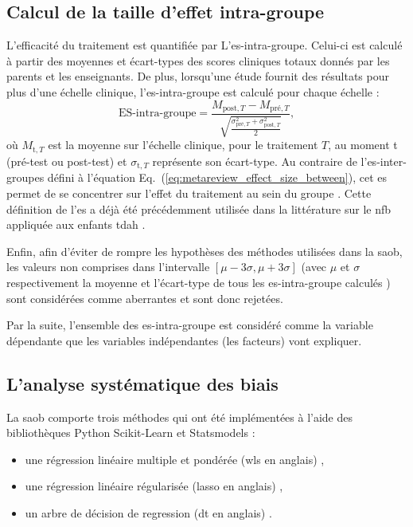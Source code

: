\subsection{Calcul de la taille d'effet intra-groupe}

L'efficacité du traitement est quantifiée par L'\gls{es}-intra-groupe. Celui-ci est calculé à partir des moyennes et écart-types des scores 
cliniques totaux donnés par les parents et les enseignants. De plus, lorsqu'une étude 
fournit des résultats pour plus d'une échelle clinique, l'\gls{es}-intra-groupe est calculé pour chaque échelle :
\begin{equation}
\label{eq:factors_effect_size_within_subject}
\text{ES-intra-groupe} = \frac{M_{\text{post},T} - M_{\text{pré},T}}{\sqrt{\frac{\sigma_{\text{pré},T}^2 + \sigma_{\text{post},T}^2}{2}}},
\end{equation} 
\noindent où $M_{\text{t},T}$ est la moyenne sur l'échelle clinique, pour le traitement $T$, au moment t (pré-test ou post-test) et $\sigma_{\text{t},T}$ représente
son écart-type. Au contraire de l'\gls{es}-inter-groupes défini à l'équation Eq.~(\ref{eq:metareview_effect_size_between}), cet \gls{es} permet de se concentrer sur l'effet du 
traitement au sein du groupe \citep{Cohen1988}. Cette définition de l'\gls{es} a déjà été précédemment utilisée dans la littérature sur le \gls{nfb} 
appliquée aux enfants \gls{tdah} \citep{Arns2009, Maurizio2014, Strehl2017}. 

Enfin, afin d'éviter de rompre les hypothèses des méthodes utilisées dans la \gls{saob}, les valeurs non comprises dans l'intervalle 
$[\mu - 3 \sigma, \mu + 3 \sigma]$ (avec $\mu$ et $\sigma$ respectivement la moyenne et l'écart-type de tous les \gls{es}-intra-groupe calculés \citep{Shewhart1931})
sont considérées comme aberrantes et sont donc rejetées.

Par la suite, l'ensemble des \gls{es}-intra-groupe est considéré comme la variable dépendante que les variables indépendantes (les facteurs) vont expliquer. 

\subsection{L'analyse systématique des biais}

La \gls{saob} comporte trois méthodes qui ont été implémentées à l'aide des bibliothèques Python Scikit-Learn \citep[version 0.18.1]{Pedregosa2011} et Statsmodels \citep[version 0.8.0]{Seabold2010} : 
\begin{itemize}
  \item une régression linéaire multiple et pondérée (\gls{wls} en anglais) \citep{Montgomery2012},
	\item une régression linéaire régularisée (\gls{lasso} en anglais) \citep{Tibshirani1996},
	\item un arbre de décision de regression (\gls{dt} en anglais) \citep{Quinlan1986}.
\end{itemize}

